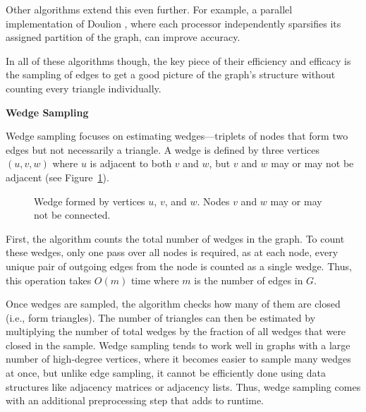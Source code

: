\documentclass[11pt]{article}
\newcommand{\subsubsubsection}[1]{
  \vspace{1em} %
  \noindent\textbf{#1} %
  \vspace{0.5em} %
}
\begin{document}
Other algorithms extend this even further.
For example, a parallel implementation of Doulion \cite{arifuzzaman_parallel_2012}, where each processor independently sparsifies its assigned partition of the graph, can improve accuracy.

In all of these algorithms though, the key piece of their efficiency and efficacy is the sampling of edges to get a good picture of the graph's structure without counting every triangle individually.

\subsubsubsection{Wedge Sampling}

Wedge sampling \cite{seshadhri_triadic_2013} focuses on estimating wedges—triplets of nodes that form two edges but not necessarily a triangle.
A wedge is defined by three vertices $(u, v, w)$ where $u$ is adjacent to both $v$ and $w$, but $v$ and $w$ may or may not be adjacent (see Figure~\ref{fig:wedge_diagram}).

\begin{figure}[h]
    \centering
    \caption{Wedge formed by vertices $u$, $v$, and $w$. Nodes $v$ and $w$ may or may not be connected.}
    \label{fig:wedge_diagram}
\end{figure}

First, the algorithm counts the total number of wedges in the graph.
To count these wedges, only one pass over all nodes is required, as at each node, every unique pair of outgoing edges from the node is counted as a single wedge.
Thus, this operation takes $O(m)$ time where $m$ is the number of edges in $G$.

Once wedges are sampled, the algorithm checks how many of them are closed (i.e., form triangles).
The number of triangles can then be estimated by multiplying the number of total wedges by the fraction of all wedges that were closed in the sample.
Wedge sampling tends to work well in graphs with a large number of high-degree vertices, where it becomes easier to sample many wedges at once, but unlike edge sampling, it cannot be efficiently done using data structures like adjacency matrices or adjacency lists.
Thus, wedge sampling comes with an additional preprocessing step that adds to runtime.
\end{document}

